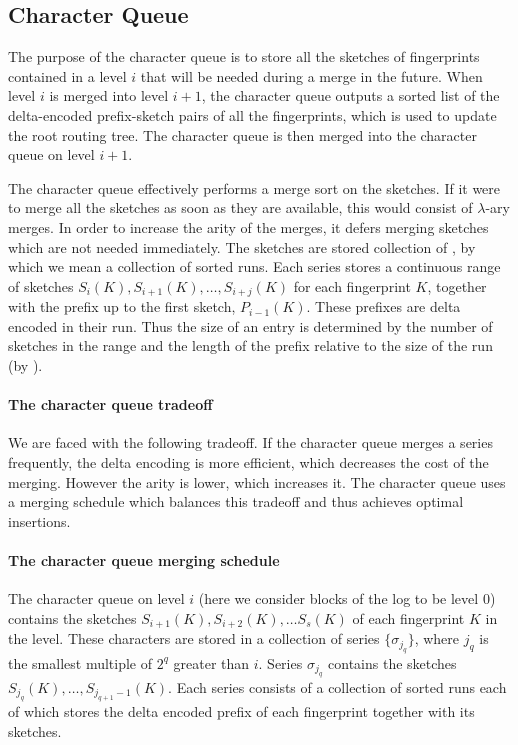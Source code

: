 \subsection{Character Queue}\label{sec:character-queue}

The purpose of the character queue is to store all the sketches of fingerprints
contained in a level $i$ that will be needed during a merge in the future.
When level $i$ is merged into level $i+1$, the character queue outputs a sorted
list of the delta-encoded prefix-sketch pairs of all the fingerprints, which is
used to update the root routing tree. The character queue is then merged into
the character queue on level $i+1$.

The character queue effectively performs a merge sort on the sketches. If it
were to merge all the sketches as soon as they are available, this would
consist of $\lambda$-ary merges.  In order to increase the arity of the merges,
it defers merging sketches which are not needed immediately. The sketches are stored
collection of , by which we mean a collection of sorted runs. Each
series stores a continuous range of sketches
$S_i(K),S_{i+1}(K),\ldots,S_{i+j}(K)$ for each fingerprint $K$, together with
the prefix up to the first sketch, $P_{i-1}(K)$. These prefixes are delta
encoded in their run. Thus the size of an entry is determined by the number of
sketches in the range and the length of the prefix relative to the size of the
run (by ).

\paragraph{The character queue tradeoff}
We are faced with the following tradeoff. If the character queue merges a
series frequently, the delta encoding is more efficient, which decreases the
cost of the merging. However the arity is lower, which increases it. The
character queue uses a merging schedule which balances this tradeoff and thus
achieves optimal insertions.

\paragraph{The character queue merging schedule}
The character queue on level $i$ (here we consider blocks of the log to be
level $0$) contains the sketches $S_{i+1}(K), S_{i+2}(K),\ldots S_s(K)$ of each
fingerprint $K$ in the level. These characters are stored in a collection of
series $\{\sigma_{j_q}\}$, where $j_q$ is the smallest multiple of $2^q$
greater than $i$. Series $\sigma_{j_q}$ contains the sketches
$S_{j_q}(K),\ldots,S_{j_{q+1}-1}(K)$. Each series consists of a collection of
sorted runs each of which stores the delta encoded prefix of each fingerprint
together with its sketches.

